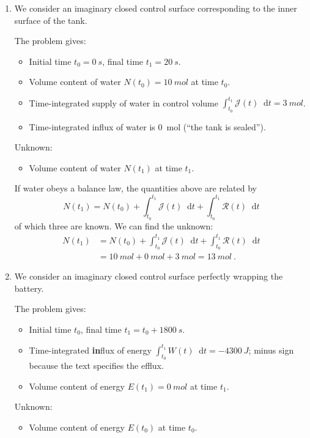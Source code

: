 \documentclass[a4paper,12pt,%
onecolumn,oneside,%
british%
]{memoir}
\newcommand*{\di}{\mathop{}\!\mathrm{d}}%
\renewcommand*{\|}[1][]{\nonscript\:#1\vert\nonscript\:\mathopen{}}
\newcommand*{\yti}{t_{0}}
\newcommand*{\ytf}{t_{1}}
\newcommand*{\dt}{\di t}
\newcommand*{\yN}{N}
\newcommand*{\yJ}{\mathcal{J}}
\newcommand*{\yR}{\mathcal{R}}
\newcommand*{\yE}{E}
\newcommand*{\yH}{W}
\begin{document}
\begin{enumerate}[exerc]
\item We consider an imaginary closed control surface corresponding to the inner surface of the tank.

  The problem gives:
  \begin{itemize}[nosep]
  \item Initial time $\yti=\qty{0}{s}$, final time $\ytf=\qty{20}{s}$.
  \item Volume content of water $\yN(\yti)=\qty{10}{mol}$ at time $\yti$.
  \item Time-integrated supply of water in control volume $\int_{\yti}^{\ytf}\!\yJ(t)\dt = \qty{3}{mol}$.
  \item Time-integrated influx of water is \qty{0}{mol} (\enquote{the tank is sealed}).
  \end{itemize}
  Unknown:
  \begin{itemize}[nosep]
  \item Volume content of water $\yN(\ytf)$ at time $\ytf$.
  \end{itemize}

  If water obeys a balance law, the quantities above are related by
  \begin{equation*}
    \yN(\ytf) = \yN(\yti) + \int_{\yti}^{\ytf}\!\!\yJ(t)\dt
    + \int_{\yti}^{\ytf}\!\!\yR(t)\dt
  \end{equation*}
of which three are known. We can find the unknown:
\begin{equation*}
  \begin{split}
    \yN(\ytf) &= \yN(\yti) + \int_{\yti}^{\ytf}\!\!\yJ(t)\dt
    + \int_{\yti}^{\ytf}\!\!\yR(t)\dt
    \\&= \qty{10}{mol} + \qty{0}{mol} + \qty{3}{mol}
    = \qty{13}{mol} \ .
  \end{split}
\end{equation*}

\item We consider an imaginary closed control surface perfectly wrapping the battery.

  The problem gives:
  \begin{itemize}[nosep]
  \item Initial time $\yti$, final time $\ytf=\yti + \qty{1800}{s}$.
  \item Time-integrated \textbf{in}flux of energy $\int_{\yti}^{\ytf}\!\yH(t)\dt = -\qty{4300}{J}$; minus sign because the text specifies the efflux.
  \item Volume content of energy $\yE(\ytf)=\qty{0}{mol}$ at time $\ytf$.
  \end{itemize}
  Unknown:
  \begin{itemize}[nosep]
  \item Volume content of energy $\yE(\yti)$ at time $\yti$.
  \end{itemize}


\end{enumerate}
\end{document}
